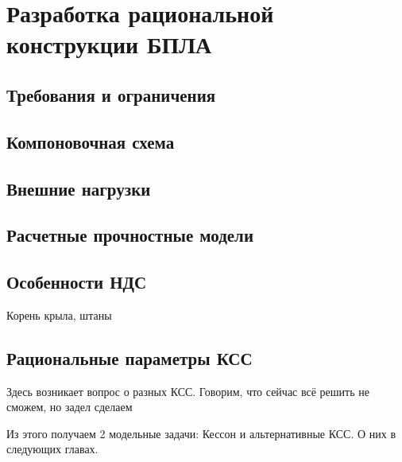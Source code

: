 \chapter{Разработка рациональной конструкции БПЛА}

\section{Требования и ограничения}



\section{Компоновочная схема}
	

\section{Внешние нагрузки}



\section{Расчетные прочностные модели}




\section{Особенности НДС}
Корень крыла, штаны


\section{Рациональные параметры КСС}
Здесь возникает вопрос о разных КСС. Говорим, что сейчас всё решить не сможем, но задел сделаем

Из этого получаем 2 модельные задачи: Кессон и альтернативные КСС. О них в следующих главах.